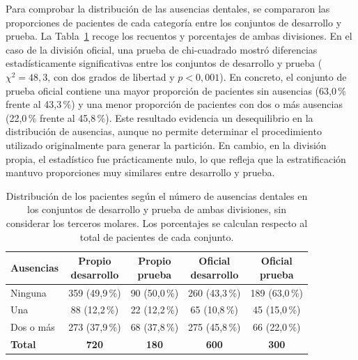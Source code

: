 Para comprobar la distribución de las ausencias dentales, se compararon las proporciones de pacientes de cada categoría entre los conjuntos de desarrollo y prueba. La Tabla~\ref{tab:distribucion-splits} recoge los recuentos y porcentajes de ambas divisiones. En el caso de la división oficial, una prueba de chi-cuadrado mostró diferencias estadísticamente significativas entre los conjuntos de desarrollo y prueba ($\chi^2 = 48{,}3$, con dos grados de libertad y $p < 0{,}001$). En concreto, el conjunto de prueba oficial contiene una mayor proporción de pacientes sin ausencias (63{,}0\,\% frente al 43{,}3\,\%) y una menor proporción de pacientes con dos o más ausencias (22{,}0\,\% frente al 45{,}8\,\%). Este resultado evidencia un desequilibrio en la distribución de ausencias, aunque no permite determinar el procedimiento utilizado originalmente para generar la partición. En cambio, en la división propia, el estadístico fue prácticamente nulo, lo que refleja que la estratificación mantuvo proporciones muy similares entre desarrollo y prueba.

\begin{table}[htbp]
    \centering
    \small
    \begin{tabular}{lcccc}
        \hline
        \textbf{Ausencias} &
        \shortstack{\textbf{Propio}\\ \textbf{desarrollo}} &
        \shortstack{\textbf{Propio}\\ \textbf{prueba}} &
        \shortstack{\textbf{Oficial}\\ \textbf{desarrollo}} &
        \shortstack{\textbf{Oficial}\\ \textbf{prueba}} \\
        \hline
        Ninguna & 359 (49{,}9\,\%) & 90 (50{,}0\,\%) & 260 (43{,}3\,\%) & 189 (63{,}0\,\%) \\
        Una & 88 (12{,}2\,\%) & 22 (12{,}2\,\%) & 65 (10{,}8\,\%) & 45 (15{,}0\,\%) \\
        Dos o más & 273 (37{,}9\,\%) & 68 (37{,}8\,\%) & 275 (45{,}8\,\%) & 66 (22{,}0\,\%) \\
        \hline
        \textbf{Total} & \textbf{720} & \textbf{180} & \textbf{600} & \textbf{300} \\
        \hline
    \end{tabular}
    \caption{Distribución de los pacientes según el número de ausencias dentales en los conjuntos de desarrollo y prueba de ambas divisiones, sin considerar los terceros molares. Los porcentajes se calculan respecto al total de pacientes de cada conjunto.}
    \label{tab:distribucion-splits}
\end{table}

